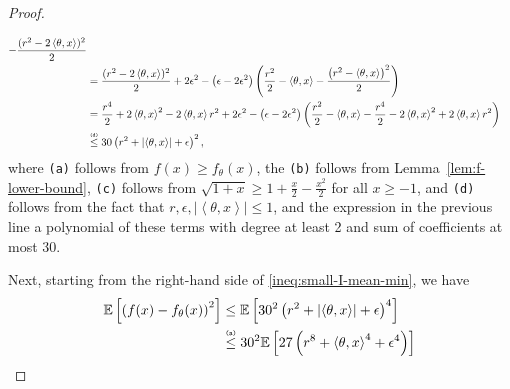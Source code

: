 \documentclass[letter, 12pt]{report}
\newcommand{\todoa}[2][]{\todo[size=\scriptsize,color=green!20!white,#1]{Alr: #2}}
\newcommand{\explan}[1]{\stackrel{\text{\tiny \texttt{#1}}}}
\newcommand{\ip}[1]{\left \langle #1 \right \rangle}
\newcommand{\paren}[1]{\left( #1 \right)}
\newcommand{\abs}[1]{\left| #1 \right|}
\newcommand{\brak}[1]{\left[ #1 \right]}
\newcommand{\E}{\mathbb E}
\newcommand{\1}{\mathbf{1}}
\theoremstyle{plain}
\theoremstyle{definition}
\theoremstyle{remark}
\begin{document}
\begin{proof}
\begin{enumcases}
\begin{align*}
{                -
                \frac{
                    (r^2 - 2\ip{\theta, x})^2
                }{2}
            }
            \\
             &
            =
            \frac{(r^2 - 2\ip{\theta, x})^2}{2}
            +
            2\epsilon^2
            -
            \paren{\epsilon - 2\epsilon^2}
            \paren{\frac{r^2}{2} - \ip{\theta, x} - \frac{\paren{r^2 - \ip{\theta,x}}^2}{2}}
            \\
             &
            =
            \frac{r^4}{2} + 2\ip{\theta, x}^2 - 2\ip{\theta, x}r^2
            +
            2\epsilon^2
            -
            \paren{\epsilon - 2\epsilon^2}
            \paren{\frac{r^2}{2} - \ip{\theta, x} -
                \frac{r^4}{2} - 2\ip{\theta, x}^2 + 2\ip{\theta, x}r^2
            }
            \\
             &
            \explan{(d)}
            \leq
            30
            \paren{r^2 + \abs{\ip{\theta, x}} + \epsilon}^2
            ,
        \end{align*}
        where \texttt{(a)} follows from $f(x) \geq f_\theta(x)$,
        the \texttt{(b)} follows from Lemma~\ref{lem:f-lower-bound},
        \texttt{(c)} follows from $\sqrt{1 + x} \geq 1 + \frac{x}{2} - \frac{x^2}{2}$ for all $x\geq-1$,
        and \texttt{(d)} follows from the fact that $r, \epsilon, \abs{\ip{\theta, x}} \leq 1$,
        and the expression in the previous line a polynomial of
        these terms with degree at least 2 and sum of coefficients at most 30.
    \end{enumcases}
    Next,
    starting from the right-hand side of \cref{ineq:small-I-mean-min},
    we have
    \begin{align*}
        \E\brak{
            \paren{
                f(x)
                -
                f_\theta(x)
            }^2
        }
         & \leq
        \E\brak{
            30^2
            \paren{
                r^2
                +
                \abs{\ip{\theta, x}}
                +
                \epsilon
            }^4
        }
        \\
         &
        \explan{(a)}
        \leq
        30^2
        \E\brak{
            27
            \paren{
                r^8
                +
                \ip{\theta, x}^4
                +
                \epsilon^4
            }
        }
        \\

\end{align*}
\end{proof}
\end{document}
